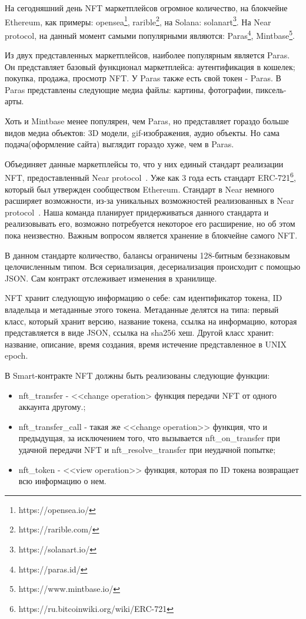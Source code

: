 
    На сегодняшний день NFT маркетплейсов огромное количество, на блокчейне Ethereum, как примеры: opensea\footnote{https://opensea.io/}, rarible\footnote{https://rarible.com/}, на Solana: solanart\footnote{https://solanart.io/}. На Near protocol, на данный момент самыми популярными являются: Paras\footnote{https://paras.id/}, Mintbase\footnote{https://www.mintbase.io/}.

    Из двух представленных маркетплейсов, наиболее популярным является Paras. Он представляет базовый функционал маркетплейса: аутентификация в кошелек; покупка, продажа, просмотр NFT. У Paras также есть свой токен - Paras. В Paras представлены следующие медиа файлы: картины, фотографии, пиксель-арты.

    Хоть и Mintbase менее популярен, чем Paras, но представляет гораздо больше видов медиа объектов: 3D модели, gif-изображения, аудио объекты. Но сама подача(оформление сайта) выглядит гораздо хуже, чем в Paras.

    Объединяет данные маркетплейсы то, что у них единый стандарт реализации NFT, предоставленный Near protocol~\cite*{nearspec}. Уже как 3 года есть стандарт ERC-721\footnote{https://ru.bitcoinwiki.org/wiki/ERC-721}, который был утвержден сообществом Ethereum. Стандарт в Near немного расширяет возможности, из-за уникальных возможностей реализованных в Near protocol~\cite*{nearspec}. Наша команда планирует придерживаться данного стандарта и реализовывать его, возможно потребуется некоторое его расширение, но об этом пока неизвестно. Важным вопросом является хранение в блокчейне самого NFT.

    В данном стандарте количество, балансы ограничены 128-битным беззнаковым целочисленным типом. Вся сериализация, десериализация происходит с помощью JSON. Сам контракт отслеживает изменения в хранилище.

    NFT хранит следующую информацию о себе: сам идентификатор токена, ID владельца и метаданные этого токена. Метаданные делятся на типа: первый класс, который хранит версию, название токена, ссылка на информацию, которая представляется в виде JSON, ссылка на sha256 хеш. Другой класс хранит: название, описание, время создания, время истечение представленное в UNIX epoch.

    В Smart-контракте NFT должны быть реализованы следующие функции:
    
    \begin{itemize}
        \item nft\_transfer - <<change operation> функция передачи NFT от одного аккаунта другому.;
        \item nft\_transfer\_call - такая же <<change operation>> функция, что и предыдущая, за исключением того, что вызывается nft\_on\_transfer при удачной передачи NFT и nft\_resolve\_transfer при неудачной попытке;
        \item nft\_token - <<view operation>> функция, которая по ID токена возвращает всю информацию о нем.
    \end{itemize}